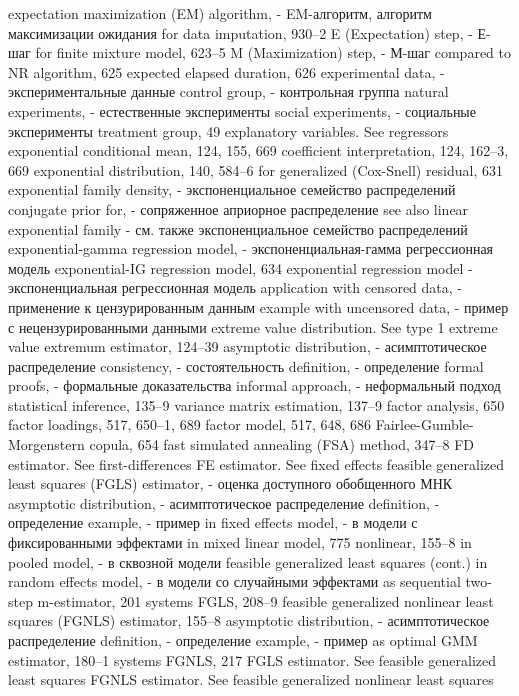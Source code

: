 expectation maximization (EM) algorithm, - EM-алгоритм, алгоритм максимизации ожидания
for data imputation, 930–2
E (Expectation) step, - Е-шаг
for finite mixture model, 623–5 
M (Maximization) step, - М-шаг
compared to NR algorithm, 625
expected elapsed duration, 626 
experimental data, - экспериментальные данные
control group, - контрольная группа
natural experiments, - естественные эксперименты 
social experiments, - социальные эксперименты 
treatment group, 49
explanatory variables. See regressors exponential conditional mean, 124, 155, 669 
coefficient interpretation, 124, 162–3, 669
exponential distribution, 140, 584–6
for generalized (Cox-Snell) residual, 631
exponential family density, - экспоненциальное семейство распределений 
conjugate prior for, - сопряженное априорное распределение
see also linear exponential family - см. также экспоненциальное семейство распределений
exponential-gamma regression model, - экспоненциальная-гамма регрессионная модель
exponential-IG regression model, 634 
exponential regression model - экспоненциальная регрессионная модель
application with censored data, - применение к цензурированным данным
example with uncensored data, - пример с нецензурированными данными
extreme value distribution. See type 1 extreme value extremum estimator, 124–39
asymptotic distribution, - асимптотическое распределение 
consistency, - состоятельность
definition, - определение
formal proofs, - формальные доказательства
informal approach, - неформальный подход 
statistical inference, 135–9 variance matrix estimation, 137–9
factor analysis, 650
factor loadings, 517, 650–1, 689
factor model, 517, 648, 686 Fairlee-Gumble-Morgenstern copula, 654
fast simulated annealing (FSA) method, 347–8
FD estimator. See first-differences
FE estimator. See fixed effects
feasible generalized least squares (FGLS) estimator, - оценка доступного обобщенного МНК
asymptotic distribution, - асимптотическое распределение 
definition, - определение
example, - пример
in fixed effects model, - в модели с фиксированными эффектами 
in mixed linear model, 775 nonlinear, 155–8
in pooled model, - в сквозной модели
feasible generalized least squares (cont.)
in random effects model, - в модели со случайными эффектами
as sequential two-step m-estimator, 201 systems FGLS, 208–9
feasible generalized nonlinear least squares (FGNLS) estimator, 155–8
asymptotic distribution, - асимптотическое распределение 
definition, - определение
example, - пример
as optimal GMM estimator, 180–1 systems FGNLS, 217
FGLS estimator. See feasible generalized least squares FGNLS estimator. See feasible generalized nonlinear least squares

